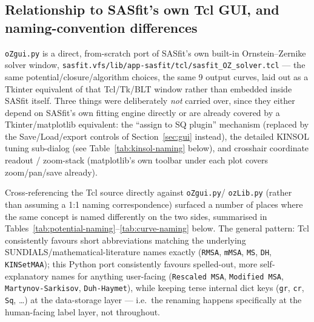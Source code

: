 \documentclass[11pt,a4paper]{article}
\newcommand{\code}[1]{\texttt{#1}}
\begin{document}
\subsection{Relationship to SASfit's own Tcl GUI, and naming-convention differences}
\label{sec:tcl-comparison}

\code{oZgui.py} is a direct, from-scratch port of SASfit's own built-in
Ornstein--Zernike solver window,
\code{sasfit.vfs/lib/app-sasfit/tcl/sasfit\_OZ\_solver.tcl} --- the same
potential/closure/algorithm choices, the same 9 output curves, laid out as a
Tkinter equivalent of that Tcl/Tk/BLT window rather than embedded inside
SASfit itself. Three things were deliberately \emph{not} carried over, since
they either depend on SASfit's own fitting engine directly or are already
covered by a Tkinter/matplotlib equivalent: the ``assign to SQ plugin''
mechanism (replaced by the Save/Load/export controls of
Section~\ref{sec:gui} instead), the detailed KINSOL tuning sub-dialog (see
Table~\ref{tab:kinsol-naming} below), and crosshair coordinate readout /
zoom-stack (matplotlib's own toolbar under each plot covers zoom/pan/save
already).

Cross-referencing the Tcl source directly against \code{oZgui.py}/
\code{ozLib.py} (rather than assuming a 1:1 naming correspondence) surfaced a
number of places where the same concept is named differently on the two
sides, summarised in Tables~\ref{tab:potential-naming}--\ref{tab:curve-naming}
below. The general pattern: Tcl consistently favours short abbreviations
matching the underlying SUNDIALS/mathematical-literature names exactly
(\code{RMSA}, \code{mMSA}, \code{MS}, \code{DH}, \code{KINSetMAA}); this
Python port consistently favours spelled-out, more self-explanatory names for
anything user-facing (\code{Rescaled MSA}, \code{Modified MSA},
\code{Martynov-Sarkisov}, \code{Duh-Haymet}), while keeping terse internal
dict keys (\code{gr}, \code{cr}, \code{Sq}, \ldots) at the data-storage layer
--- i.e.\ the renaming happens specifically at the human-facing label layer,
not throughout.
\end{document}
